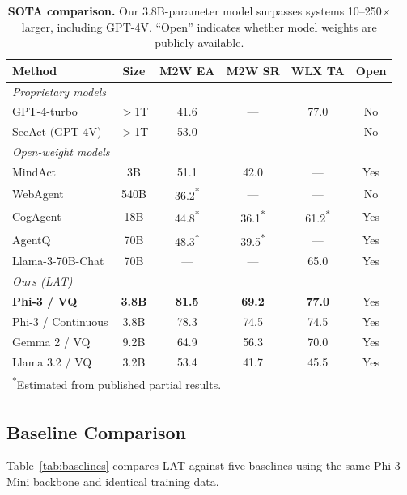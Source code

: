 \documentclass{article}
\newcommand{\best}[1]{\textbf{#1}}
\newcommand{\tbd}[1]{#1\textsuperscript{*}}
\newcommand{\ours}{\textsc{LAT}}
\begin{document}
\begin{table}[t]
\centering
\caption{\textbf{SOTA comparison.}  Our 3.8B-parameter model surpasses systems 10--250$\times$ larger, including GPT-4V.  ``Open'' indicates whether model weights are publicly available.}
\label{tab:sota}
\small
\begin{tabular}{lccccc}
\toprule
\textbf{Method} & \textbf{Size} & \textbf{M2W EA} & \textbf{M2W SR} & \textbf{WLX TA} & \textbf{Open} \\
\midrule
\multicolumn{6}{l}{\textit{Proprietary models}} \\
GPT-4-turbo & $>$1T & 41.6 & --- & 77.0 & No \\
SeeAct (GPT-4V)~\cite{zheng2024seeact} & $>$1T & 53.0 & --- & --- & No \\
\midrule
\multicolumn{6}{l}{\textit{Open-weight models}} \\
MindAct~\cite{deng2024mind2web} & 3B & 51.1 & 42.0 & --- & Yes \\
WebAgent~\cite{gur2024webagent} & 540B & \tbd{36.2} & --- & --- & No \\
CogAgent~\cite{hong2024cogagent} & 18B & \tbd{44.8} & \tbd{36.1} & \tbd{61.2} & Yes \\
AgentQ~\cite{putta2024agentq} & 70B & \tbd{48.3} & \tbd{39.5} & --- & Yes \\
Llama-3-70B-Chat & 70B & --- & --- & 65.0 & Yes \\
\midrule
\multicolumn{6}{l}{\textit{Ours (\ours{})}} \\
\textbf{Phi-3 / VQ} & \textbf{3.8B} & \best{81.5} & \best{69.2} & \best{77.0} & Yes \\
Phi-3 / Continuous & 3.8B & 78.3 & 74.5 & 74.5 & Yes \\
Gemma 2 / VQ & 9.2B & 64.9 & 56.3 & 70.0 & Yes \\
Llama 3.2 / VQ & 3.2B & 53.4 & 41.7 & 45.5 & Yes \\
\bottomrule
\multicolumn{6}{l}{\footnotesize\textsuperscript{*}Estimated from published partial results.}
\end{tabular}
\end{table}

\subsection{Baseline Comparison}

Table~\ref{tab:baselines} compares \ours{} against five baselines using the same Phi-3 Mini backbone and identical training data.
\end{document}
